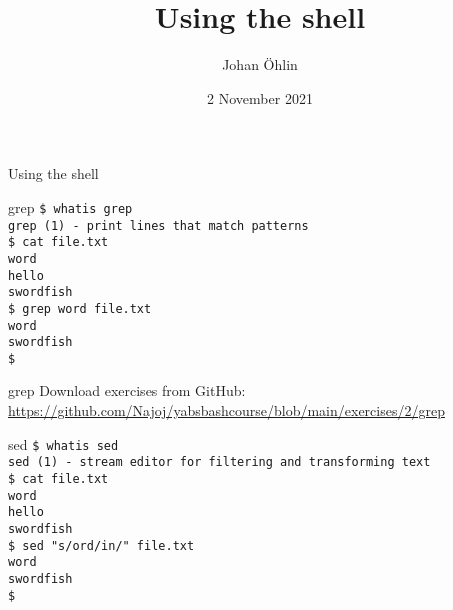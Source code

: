 \documentclass{beamer}
\title{Using the shell}
\date{2 November 2021}
\author{Johan Öhlin}
\institute{Yabs}
\let\tt\texttt
\begin{document}
\begin{frame}{Using the shell}
\maketitle
\end{frame}

\begin{frame}{grep}
        \tt{\$ whatis grep}\\
        \tt{grep (1)  - print lines that match patterns}\\
        \tt{\$ cat file.txt} \\
        \tt{word} \\
        \tt{hello} \\
        \tt{swordfish} \\
        \tt{\$ grep word file.txt} \\
        \tt{word} \\
        \tt{swordfish} \\
        \tt{\$ } \\
\end{frame}

\begin{frame}{grep}
        Download exercises from GitHub: \\
        \url{https://github.com/Najoj/yabsbashcourse/blob/main/exercises/2/grep}
\end{frame}

\begin{frame}{sed}
        \tt{\$ whatis sed}\\
        \tt{sed (1)   - stream editor for filtering and transforming text}\\
        \tt{\$ cat file.txt} \\
        \tt{word} \\
        \tt{hello} \\
        \tt{swordfish} \\
        \tt{\$ sed "s/ord/in/" file.txt} \\
        \tt{word} \\
        \tt{swordfish} \\
        \tt{\$ } \\
\end{frame}
\end{document}
